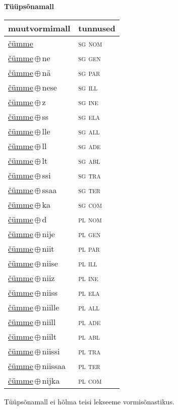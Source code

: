 

\vspace{3.5em}
\noindent \begin{minipage}{\textwidth}
\noindent \textbf{Tüüpsõnamall \,}\\

\begin{sideways}
\begin{tabular}{l l}
muutvormimall & tunnused \\
\hline
\underline{čümme} & \textsc{ sg nom } \\
\underline{čümme}\,$\oplus$\,ne & \textsc{ sg gen } \\
\underline{čümme}\,$\oplus$\,nä & \textsc{ sg par } \\
\underline{čümme}\,$\oplus$\,nese & \textsc{ sg ill } \\
\underline{čümme}\,$\oplus$\,z & \textsc{ sg ine } \\
\underline{čümme}\,$\oplus$\,ss & \textsc{ sg ela } \\
\underline{čümme}\,$\oplus$\,lle & \textsc{ sg all } \\
\underline{čümme}\,$\oplus$\,ll & \textsc{ sg ade } \\
\underline{čümme}\,$\oplus$\,lt & \textsc{ sg abl } \\
\underline{čümme}\,$\oplus$\,ssi & \textsc{ sg tra } \\
\underline{čümme}\,$\oplus$\,ssaa & \textsc{ sg ter } \\
\underline{čümme}\,$\oplus$\,ka & \textsc{ sg com } \\
\underline{čümme}\,$\oplus$\,d & \textsc{ pl nom } \\
\underline{čümme}\,$\oplus$\,nije & \textsc{ pl gen } \\
\underline{čümme}\,$\oplus$\,niit & \textsc{ pl par } \\
\underline{čümme}\,$\oplus$\,niise & \textsc{ pl ill } \\
\underline{čümme}\,$\oplus$\,niiz & \textsc{ pl ine } \\
\underline{čümme}\,$\oplus$\,niiss & \textsc{ pl ela } \\
\underline{čümme}\,$\oplus$\,niille & \textsc{ pl all } \\
\underline{čümme}\,$\oplus$\,niill & \textsc{ pl ade } \\
\underline{čümme}\,$\oplus$\,niilt & \textsc{ pl abl } \\
\underline{čümme}\,$\oplus$\,niissi & \textsc{ pl tra } \\
\underline{čümme}\,$\oplus$\,niissaa & \textsc{ pl ter } \\
\underline{čümme}\,$\oplus$\,nijka & \textsc{ pl com } \\
\end{tabular}
\end{sideways}
\label{tab:tüüpsõnamall-čümme}

\end{minipage}

 
\vspace{1em}
\noindent Tüüpsõnamall  ei hõlma teisi lekseeme vormi\-sõnastikus.
